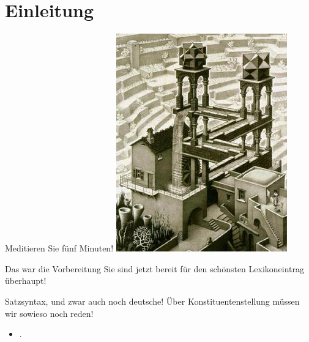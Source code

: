 \section{Einleitung}

\begin{frame}
  {Meditieren Sie fünf Minuten!}
  \onslide<+->
  \onslide<+->
  \centering 
  \includegraphics[height=0.7\textheight]{graphics/escher_low}\\
\end{frame}

\begin{frame}
  {Das war die Vorbereitung}
  \onslide<+->
  \onslide<+->
  \centering 
  Sie sind jetzt bereit für den schönsten Lexikoneintrag überhaupt!\\
  \Doppelzeile
  \onslide<+->
\end{frame}

\begin{frame}
  {Satzsyntax, und zwar auch noch deutsche!}
  \onslide<+->
  \onslide<+->
  Über Konstituentenstellung müssen wir sowieso noch reden!\\
  \Zeile
  \begin{itemize}[<+->]
    \item .
  \end{itemize}
  \Zeile
  \onslide<+->
  \centering 
  \\
\end{frame}

